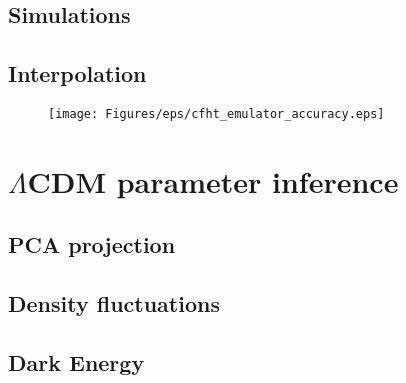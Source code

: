 \subsection{Simulations}

\subsection{Interpolation}

\begin{figure}
\begin{center}
\texttt{[image: Figures/eps/cfht\_emulator\_accuracy.eps]}
\end{center}
\caption{}
\label{fig:6:interpolation}
\end{figure}



\section{$\Lambda$CDM parameter inference}

\subsection{PCA projection}

\subsection{Density fluctuations}

\subsection{Dark Energy}


